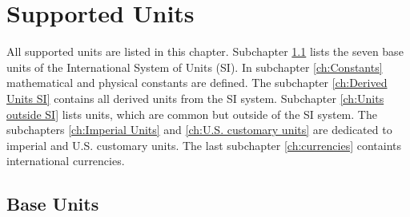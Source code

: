 \documentclass{ltxdoc}
\begin{document}
\newcommand{\C}[1][]{\mathrm{C}^{#1}\,}

\newcommand{\1}{\mathrm{1}}




\newpage
\section{Supported Units}
\label{ch:Supported Units}

All supported units are listed in this chapter. Subchapter \ref{ch:Base Units} lists the seven base units of the International System of Units (SI). In subchapter \ref{ch:Constants}  mathematical and physical constants are defined. The subchapter \ref{ch:Derived Units SI} contains all derived units from the SI system. Subchapter \ref{ch:Units outside SI} lists units, which are common but outside of the SI system. The subchapters \ref{ch:Imperial Units} and \ref{ch:U.S. customary units} are dedicated to imperial and U.S. customary units. The last subchapter \ref{ch:currencies} containts international currencies.

\subsection{Base Units}
\label{ch:Base Units}
\end{document}
